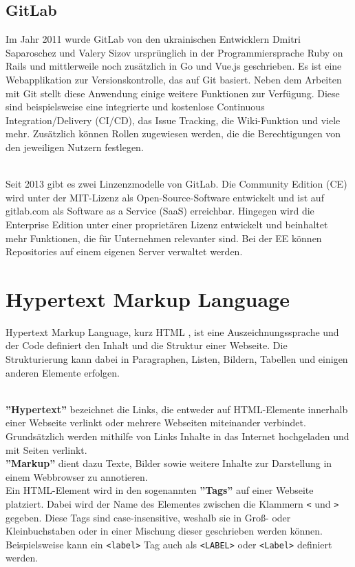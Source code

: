 \subsection{GitLab}
Im Jahr 2011 wurde GitLab \cite{gitlab_2020} von den ukrainischen Entwicklern Dmitri Saparoschez und Valery Sizov ursprünglich in der Programmiersprache Ruby on Rails und mittlerweile noch zusätzlich in Go und Vue.js geschrieben. Es ist eine Webapplikation zur Versionskontrolle, das auf Git basiert. Neben dem Arbeiten mit Git stellt diese Anwendung einige weitere Funktionen zur Verfügung. Diese sind beispielsweise eine integrierte und kostenlose Continuous Integration/Delivery (CI/CD), das Issue Tracking, die Wiki-Funktion und viele mehr. Zusätzlich können Rollen zugewiesen werden, die die Berechtigungen von den jeweiligen Nutzern festlegen.

\mbox{}\\Seit 2013 gibt es zwei Linzenzmodelle von GitLab. Die Community Edition (CE) wird unter der MIT-Lizenz als Open-Source-Software entwickelt und ist auf gitlab.com als Software as a Service (SaaS) erreichbar. Hingegen wird die Enterprise Edition unter einer proprietären Lizenz entwickelt und beinhaltet mehr Funktionen, die für Unternehmen relevanter sind. Bei der EE können Repositories auf einem eigenen Server verwaltet werden.

\section{Hypertext Markup Language}
Hypertext Markup Language, kurz HTML \cite{html_2021}, ist eine Auszeichnungssprache und der Code definiert den Inhalt und die Struktur einer Webseite. Die Strukturierung kann dabei in Paragraphen, Listen, Bildern, Tabellen und einigen anderen Elemente erfolgen. 

\mbox{}\\
\textbf{''Hypertext''} bezeichnet die Links, die entweder auf HTML-Elemente innerhalb einer Webseite verlinkt oder mehrere Webseiten miteinander verbindet. Grundsätzlich werden mithilfe von Links Inhalte in das Internet hochgeladen und mit Seiten verlinkt.\\
\textbf{''Markup''} dient dazu Texte, Bilder sowie weitere Inhalte zur Darstellung in einem Webbrowser zu annotieren.\\
Ein HTML-Element wird in den sogenannten \textbf{''Tags''} auf einer Webseite platziert. Dabei wird der Name des Elementes zwischen die Klammern \texttt{<} und \texttt{>} gegeben. Diese Tags sind case-insensitive, weshalb sie in Groß- oder Kleinbuchstaben oder in einer Mischung dieser geschrieben werden können. Beispielsweise kann ein \texttt{<label>} Tag auch als \texttt{<LABEL>} oder \texttt{<Label>} definiert werden.

